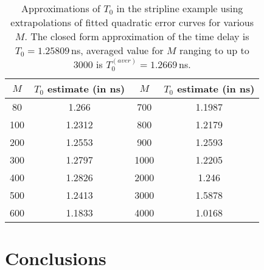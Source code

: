 \documentclass[journal,twoside]{IEEEtran}
\begin{document}
\begin{table}[h]
\begin{center}
\begin{tabular}{|c|c||c|c|}
\hline
\rule{0cm}{10pt}
$M$ & $T_0$ estimate (in ns) & $M$ & $T_0$ estimate (in ns) \\[3pt]
\hline
\rule{0cm}{10pt}
  80 &     1.266 & 700  & 1.1987 \\[3pt]
\hline
\rule{0cm}{10pt}  
  100 &  1.2312  &   800  &  1.2179 \\[3pt]
\hline
\rule{0cm}{10pt}  
200  &  1.2553 & 900  & 1.2593 \\[3pt] 
\hline
\rule{0cm}{10pt}    
300  &  1.2797 & 1000  &  1.2205 \\
\hline
\rule{0cm}{10pt}    
400  &  1.2826 & 2000  &  1.246 \\
\hline
\rule{0cm}{10pt}    
500  &  1.2413 & 3000  &  1.5878 \\
\hline
\rule{0cm}{10pt}    
600  &  1.1833 & 4000  &  1.0168 \\
\hline
\end{tabular}
\end{center}
\caption{Approximations of $T_0$ in the stripline example using extrapolations of fitted quadratic error curves for various $M$. The closed form approximation of the time delay is $T_0=1.25809$\,ns, averaged value for $M$ ranging to up to $3000$ is $T_0^{(aver)}=1.2669$\,ns.}
\label{T0approx_stripline_Wang_table}
\end{table} 

 
\section{Conclusions} \label{conclusions}
\end{document}
